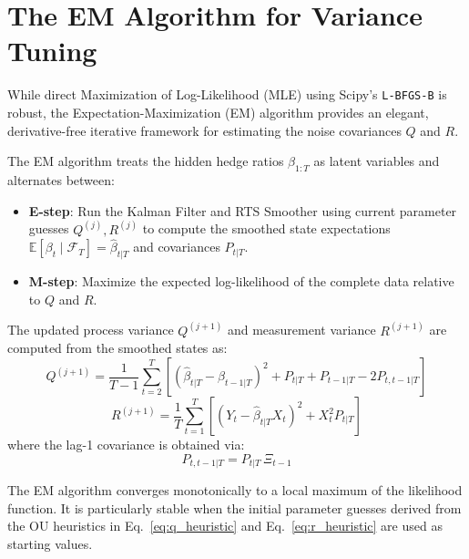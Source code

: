 \documentclass[10pt,a4paper,twocolumn]{article}
\begin{document}
\section{The EM Algorithm for Variance Tuning}

While direct Maximization of Log-Likelihood (MLE) using Scipy's \texttt{L-BFGS-B} is robust, the Expectation-Maximization (EM) algorithm provides an elegant, derivative-free iterative framework for estimating the noise covariances $Q$ and $R$. 

The EM algorithm treats the hidden hedge ratios $\beta_{1:T}$ as latent variables and alternates between:
\begin{itemize}
  \item \textbf{E-step}: Run the Kalman Filter and RTS Smoother using current parameter guesses $Q^{(j)}, R^{(j)}$ to compute the smoothed state expectations $\mathbb{E}[\beta_t \mid \mathcal{F}_T] = \hat{\beta}_{t|T}$ and covariances $P_{t|T}$.
  \item \textbf{M-step}: Maximize the expected log-likelihood of the complete data relative to $Q$ and $R$.
\end{itemize}

\begin{tcolorbox}[mathbox={EM Update Equations}]
The updated process variance $Q^{(j+1)}$ and measurement variance $R^{(j+1)}$ are computed from the smoothed states as:
\begin{equation}
  Q^{(j+1)} = \frac{1}{T-1} \sum_{t=2}^T \left[ (\hat{\beta}_{t|T} - \hat{\beta}_{t-1|T})^2 + P_{t|T} + P_{t-1|T} - 2 P_{t,t-1|T} \right]
  \label{eq:Q_em}
\end{equation}
\begin{equation}
  R^{(j+1)} = \frac{1}{T} \sum_{t=1}^T \left[ (Y_t - \hat{\beta}_{t|T} X_t)^2 + X_t^2 P_{t|T} \right]
  \label{eq:R_em}
\end{equation}
where the lag-1 covariance is obtained via:
\[
  P_{t,t-1|T} = P_{t|T}\,\Xi_{t-1}
\]
\end{tcolorbox}
The EM algorithm converges monotonically to a local maximum of the likelihood function. It is particularly stable when the initial parameter guesses derived from the OU heuristics in Eq.~\eqref{eq:q_heuristic} and Eq.~\eqref{eq:r_heuristic} are used as starting values.

\end{document}
